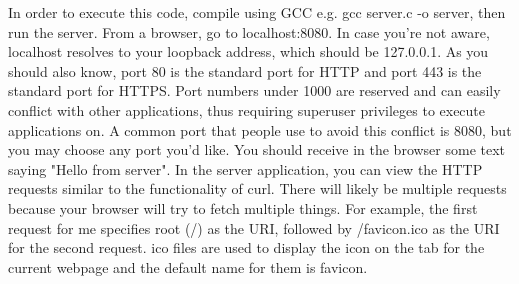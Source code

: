 \documentclass{article}
\begin{document}
In order to execute this code, compile using GCC e.g. gcc server.c -o server, then run the server. From a
browser, go to localhost:8080. In case you're not aware, localhost resolves to your loopback address, which
should be 127.0.0.1. As you should also know, port 80 is the standard port for HTTP and port 443 is the
standard port for HTTPS. Port numbers under 1000 are reserved and can easily conflict with other applications,
thus requiring superuser privileges to execute applications on. A common port that people use to avoid this
conflict is 8080, but you may choose any port you'd like. You should receive in the browser some text saying
"Hello from server". In the server application, you can view the HTTP requests similar to the functionality of
curl. There will likely be multiple requests because your browser will try to fetch multiple things. For
example, the first request for me specifies root (/) as the URI, followed by /favicon.ico as the URI for the
second request. ico files are used to display the icon on the tab for the current webpage and the default name
for them is favicon.
\end{document}
